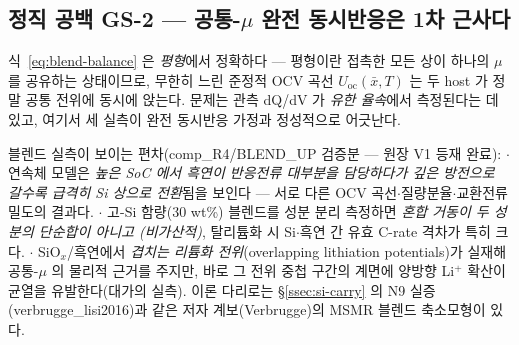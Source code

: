 \subsection{정직 공백 GS-2 --- 공통-$\mu$ 완전 동시반응은 1차 근사다}\label{ssec:si-blend-gs2}
식~\eqref{eq:blend-balance} 은 \emph{평형}에서 정확하다 --- 평형이란 접촉한 모든 상이 하나의 $\mu$ 를
공유하는 상태이므로, 무한히 느린 준정적 OCV 곡선 $U_\mathrm{oc}(\bar x,T)$ 는 두 host 가 정말 공통 전위에
동시에 앉는다. 문제는 관측 dQ/dV 가 \emph{유한 율속}에서 측정된다는 데 있고, 여기서 세 실측이 완전
동시반응 가정과 정성적으로 어긋난다.

\begin{srcbox}
블렌드 실측이 보이는 편차(comp\_R4/BLEND\_UP 검증분 --- 원장 V1 등재 완료):
$\cdot$ 연속체 모델은 \emph{높은 SoC 에서 흑연이 반응전류 대부분을 담당하다가 깊은 방전으로 갈수록
급격히 Si 상으로 전환}됨을 보인다 --- 서로 다른 OCV 곡선$\cdot$질량분율$\cdot$교환전류밀도의
결과다\cite{ai_composite2022}.
$\cdot$ 고-Si 함량(30 wt\%) 블렌드를 성분 분리 측정하면 \emph{혼합 거동이 두 성분의 단순합이 아니고
(비가산적)}, 탈리튬화 시 Si$\cdot$흑연 간 유효 C-rate 격차가 특히 크다\cite{chatzogiannakis_blend2025}.
$\cdot$ SiO$_x$/흑연에서 \emph{겹치는 리튬화 전위}(overlapping lithiation potentials)가 실재해 공통-$\mu$
의 물리적 근거를 주지만, 바로 그 전위 중첩 구간의 계면에 양방향 Li$^+$ 확산이 균열을 유발한다(대가의
실측)\cite{zhan_siox2026}. 이론 다리로는 \S\ref{ssec:si-carry} 의 N9 실증(verbrugge\_lisi2016)과
같은 저자 계보(Verbrugge)의 MSMR 블렌드 축소모형이 있다\cite{tu_blend2024}.
\end{srcbox}

